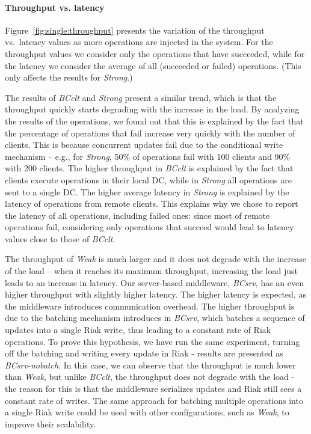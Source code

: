 \documentclass[conference]{IEEEtran}
\begin{document}
\paragraph{Throughput vs. latency}
Figure~\ref{fig:single:throughput} presents the variation of the throughput vs.\ latency values as
more operations are injected in the system.
For the throughput values we consider only the operations that have succeeded, while for
the latency we consider the average of all (succeeded or failed) operations. (This only affects the results for \emph{Strong}.)

The results of \emph{BCclt} and \emph{Strong} present a similar trend, which
is that the
throughput quickly starts degrading with the increase in the load.
By analyzing the results of the operations, we found out that this is explained
by the fact that the percentage of operations that fail increase very quickly with
the number of clients. This is because concurrent updates fail due to the conditional write 
mechanism -- e.g., for \emph{Strong}, 50\% of operations 
fail with 100 clients and 90\% with 200 clients.
The  higher throughput in \emph{BCclt} is explained by the fact that 
clients execute operations in their local DC, while in \emph{Strong} all operations
are sent to a single DC. 
The higher average latency in \emph{Strong} is explained by the latency of
operations from remote clients. 
This explains why we chose to report the latency 
of all operations, including failed ones: since most of remote operations fail, considering
only operations that succeed would lead to latency values close to those of
\emph{BCclt}.

The throughput of \emph{Weak} is much larger and it does not degrade with
the increase of the load -- when it reaches its maximum throughput, increasing
the load just leads to an increase in latency. 
Our server-based middleware, \emph{BCsrv}, has an even higher throughput with slightly
higher latency. 
The higher latency is expected, as the middleware introduces communication overhead.
The higher throughput is due to the batching mechanism introduces in \emph{BCsrv},
which batches a sequence of updates into a single Riak write,
thus leading to a constant rate of Riak operations.
To prove this hypothesis, we have run the same experiment, turning off the batching and writing
every update in Riak - results
are presented as \emph{BCsrv-nobatch}.
In this case, we can observe that the throughput is much lower than \emph{Weak}, but unlike
\emph{BCclt}, the throughput does not degrade with the load - the reason for this is that
the middleware serializes updates and Riak still sees a constant rate of writes. 
The same approach for batching multiple operations into a single Riak write could
be used with other configurations, such as \emph{Weak},
to improve their scalability.
\end{document}
